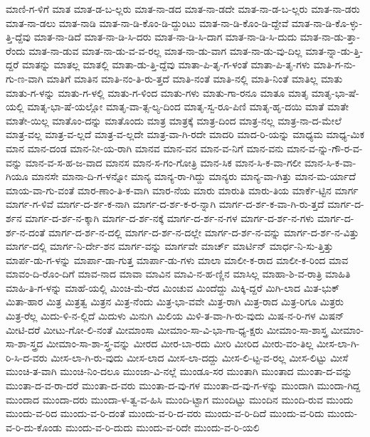 {ಮಾಣಿ-ಗ-ಳಿಗೆ
ಮಾತ
ಮಾತ-ಡ-ಬ-ಲ್ಲರು
ಮಾತ-ನಾ-ಡದ
ಮಾತ-ನಾ-ಡದೇ
ಮಾತ-ನಾ-ಡ-ಬ-ಲ್ಲರು
ಮಾತ-ನಾ-ಡರು
ಮಾತ-ನಾ-ಡಲು
ಮಾತ-ನಾಡಿ
ಮಾತ-ನಾ-ಡಿ-ಕೊಂ-ಡಿ-ದ್ದುಂಟು
ಮಾತ-ನಾ-ಡಿ-ಕೊಂ-ಡಿ-ದ್ದೇವೆ
ಮಾತ-ನಾ-ಡಿ-ಕೊ-ಳ್ಳು-ತ್ತಿ-ದ್ದೆವು
ಮಾತ-ನಾ-ಡಿದೆ
ಮಾತ-ನಾ-ಡಿ-ಸಿ-ದರು
ಮಾತ-ನಾ-ಡಿ-ಸಿ-ದಾಗ
ಮಾತ-ನಾ-ಡಿ-ಸಿ-ದುದು
ಮಾತ-ನಾ-ಡು-ತ್ತಾ-ರೆಂದು
ಮಾತ-ನಾ-ಡುವ
ಮಾತ-ನಾ-ಡು-ವ-ವ-ರಲ್ಲ
ಮಾತ-ನಾ-ಡು-ವಾಗ
ಮಾತ-ನಾ-ಡು-ವು-ದಿಲ್ಲ
ಮಾತ-ನ್ನಾ-ಡು-ತ್ತಿ-ದ್ದರೆ
ಮಾತನ್ನು
ಮಾತಲ್ಲ
ಮಾತಲ್ಲಿ
ಮಾತಾ-ಡು-ತ್ತಿ-ದ್ದೆವು
ಮಾತಾ-ಪಿ-ತೃ-ಗ-ಳಂತೆ
ಮಾತಾ-ಪಿ-ತೃ-ಗಳು
ಮಾತಿ-ಗ-ನು-ಗು-ಣ-ವಾಗಿ
ಮಾತಿಗೆ
ಮಾತಿನ
ಮಾತಿ-ನಂ-ತಿ-ರು-ತ್ತದೆ
ಮಾತಿ-ನಂತೆ
ಮಾತಿ-ನಲ್ಲಿ
ಮಾತಿ-ನಿಂತೆ
ಮಾತಿಲ್ಲ
ಮಾತು
ಮಾತು-ಗ-ಳನ್ನು
ಮಾತು-ಗ-ಳಲ್ಲಿ
ಮಾತು-ಗ-ಳಿಂದ
ಮಾತು-ಗಳು
ಮಾತು-ಗಾ-ರನೂ
ಮಾತೂ
ಮಾತೃ
ಮಾತೃ-ಭಾ-ಷೆ-ಯಲ್ಲಿ
ಮಾತೃ-ಭಾ-ಷೆ-ಯಲ್ಲೋ
ಮಾತೃ-ವಾ-ತ್ಸ-ಲ್ಯ-ದಿಂದ
ಮಾತೃ-ಸ್ವ-ರೂ-ಪಿಣಿ
ಮಾತೃ-ಹೃ-ದಯಿ
ಮಾತೆ
ಮಾತೇ
ಮಾತೇ-ಯಿಲ್ಲ
ಮಾತೊಂ-ದನ್ನು
ಮಾತೊಂದು
ಮಾತ್ರ
ಮಾತ್ರಕ್ಕೆ
ಮಾತ್ರ-ದಿಂದ
ಮಾತ್ರ-ನಲ್ಲ
ಮಾತ್ರ-ನಾ-ದ-ಮೇಲೆ
ಮಾತ್ರ-ವಲ್ಲ
ಮಾತ್ರ-ವ-ಲ್ಲದೆ
ಮಾತ್ರ-ವ-ಲ್ಲದೇ
ಮಾತ್ರ-ವಾ-ಗಿ-ರದೇ
ಮಾದರಿ
ಮಾದ-ರಿ-ಯನ್ನು
ಮಾಧ್ಯಮ
ಮಾಧ್ಯ-ಮಿಕ
ಮಾನ
ಮಾನ-ದಂಡ
ಮಾನ-ನೀ-ಯ-ರಾಗಿ
ಮಾನವ
ಮಾನ-ವನ
ಮಾನ-ವ-ನಿಗೆ
ಮಾನ-ವನು
ಮಾನ-ವ-ನ್ನು-ಗೌ-ರ-ವ-ವನ್ನು
ಮಾನ-ವ-ಸ-ಹ-ಜ-ವಾದ
ಮಾನಸ
ಮಾನ-ಸ-ಗಂ-ಗೋತ್ರಿ
ಮಾನ-ಸಿಕ
ಮಾನ-ಸಿ-ಕ-ವಾ-ಗಲೀ
ಮಾನ-ಸಿ-ಕ-ವಾ-ಗಿಯೂ
ಮಾನಸೇ
ಮಾನಾ-ದಿ-ಗ-ಳನ್ನೋ
ಮಾನ್ಯ
ಮಾನ್ಯ-ರಾ-ಗಿದ್ದು
ಮಾನ್ಯರು
ಮಾನ್ಯ-ವಾ-ಗಿತ್ತು
ಮಾನ-ಮ-ರ್ಯಾದೆ
ಮಾಯ-ವಾ-ಗು-ವಂತೆ
ಮಾರ-ಣಾಂ-ತಿ-ಕ-ವಾಗಿ
ಮಾರ-ನೆಯ
ಮಾರು
ಮಾರುತಿ
ಮಾರು-ತಿಯ
ಮಾರ್ಕೆ-ಟ್ಟಿನ
ಮಾರ್ಗ
ಮಾರ್ಗ-ಗ-ಳಿವೆ
ಮಾರ್ಗ-ದ-ರ್ಶ-ಕ-ನಾಗಿ
ಮಾರ್ಗ-ದ-ರ್ಶ-ಕ-ರ-ನ್ನಾಗಿ
ಮಾರ್ಗ-ದ-ರ್ಶ-ಕ-ವಾ-ಗಿ-ರು-ತ್ತದೆ
ಮಾರ್ಗ-ದ-ರ್ಶನ
ಮಾರ್ಗ-ದ-ರ್ಶ-ನ-ಕ್ಕಾಗಿ
ಮಾರ್ಗ-ದ-ರ್ಶ-ನಕ್ಕೆ
ಮಾರ್ಗ-ದ-ರ್ಶ-ನ-ಗಳ
ಮಾರ್ಗ-ದ-ರ್ಶ-ನ-ಗಳು
ಮಾರ್ಗ-ದ-ರ್ಶ-ನ-ದಂತೆ
ಮಾರ್ಗ-ದ-ರ್ಶ-ನ-ದಲ್ಲಿ
ಮಾರ್ಗ-ದ-ರ್ಶ-ನ-ದಲ್ಲೇ
ಮಾರ್ಗ-ದ-ರ್ಶ-ನ-ವನ್ನು
ಮಾರ್ಗ-ದ-ರ್ಶ-ನ-ವಿತ್ತು
ಮಾರ್ಗ-ದಲ್ಲಿ
ಮಾರ್ಗ-ನಿ-ರ್ದೇ-ಶನ
ಮಾರ್ಗ-ವನ್ನು
ಮಾರ್ಗವೇ
ಮಾರ್ಚ್
ಮಾರ್ಟಿನ್
ಮಾರ್ಧ-ನಿ-ಸು-ತ್ತಿತ್ತು
ಮಾರ್ಪ-ಡು-ಗ-ಳನ್ನು
ಮಾರ್ಪಾ-ಡಾ-ಗುತ್ತ
ಮಾರ್ಪಾ-ಡು-ಗಳು
ಮಾಲಾ
ಮಾಲೀ-ಕ-ರಾದ
ಮಾಲೀ-ಕ-ರಿಂದ
ಮಾವ
ಮಾವಂ-ದಿ-ರೊಂ-ದಿಗೆ
ಮಾವ-ನಾದ
ಮಾವಾ
ಮಾವಿನ
ಮಾವಿ-ನ-ಹ-ಣ್ಣಿನ
ಮಾಸಿಲ್ಲ
ಮಾಹಾ-ಶಿ-ವ-ರಾತ್ರಿ
ಮಾಹಿತಿ
ಮಾಹಿ-ತಿ-ಗ-ಳನ್ನು
ಮಾಹೆ-ಯಲ್ಲಿ
ಮಿಂಚಿ-ಮೆ-ರೆದ
ಮಿಂಚುವ
ಮಿಂದೆದ್ದು
ಮಿಕ್ಕಿ-ದ್ದರೆ
ಮಿಗಿ-ಲಾದ
ಮಿತ-ಭುಕ್
ಮಿತಾ-ಹಾರ
ಮಿತ್ರ
ಮಿತ್ರತ್ವ
ಮಿತ್ರನ
ಮಿತ್ರ-ನೆಂದು
ಮಿತ್ರ-ಭಾ-ವವೇ
ಮಿತ್ರ-ರಾಗಿ
ಮಿತ್ರ-ರಾದ
ಮಿತ್ರ-ರಿಗೂ
ಮಿತ್ರರು
ಮಿತ್ರ-ರೆಲ್ಲ
ಮಿದು-ಳಿ-ನ-ಲ್ಲಿದೆ
ಮಿದುಳು
ಮಿನುಗಿ
ಮಿಲಿಯ
ಮಿಳಿ-ತ-ವಾ-ಗಿ-ರು-ವುದು
ಮಿಷ-ನ-ರಿ-ಗಳ
ಮಿಷನ್
ಮೀಟಿ-ದರೆ
ಮೀಟು-ಗೋ-ಲಿ-ನಂತೆ
ಮೀಮಾಂಸಾ
ಮೀಮಾಂ-ಸಾ-ವಿ-ಭಾ-ಗಾ-ಧ್ಯ-ಕ್ಷರು
ಮೀಮಾಂ-ಸಾ-ಶಾಸ್ತ್ರ
ಮೀಮಾಂ-ಸಾ-ಶಾ-ಸ್ತ್ರದ
ಮೀಮಾಂ-ಸಾ-ಶಾ-ಸ್ತ್ರ-ವನ್ನು
ಮೀರದ
ಮೀರ-ಬಾ-ರದು
ಮೀರಿ
ಮೀರಿದ
ಮೀರು-ವಂ-ತಿಲ್ಲ
ಮೀಸ-ಲಾ-ಗಿ-ರಿ-ಸಿ-ದ-ವರು
ಮೀಸ-ಲಾ-ಗಿ-ರು-ವುದು
ಮೀಸ-ಲಾದ
ಮೀಸ-ಲಾ-ದದ್ದು
ಮೀಸ-ಲಿ-ಟ್ಟ-ವ-ರಲ್ಲ
ಮೀಸ-ಲಿಟ್ಟು
ಮೀಸೆ
ಮುಂಚಿ-ತ-ವಾಗಿ
ಮುಂಚಿ-ನಿಂ-ದಲೂ
ಮುಂಜಾ-ವಿ-ನಲ್ಲೆ
ಮುಂಡೂ-ಸರ
ಮುಂತಾಗಿ
ಮುಂತಾದ
ಮುಂತಾ-ದ-ವನ್ನು
ಮುಂತಾ-ದ-ವ-ರಾ-ದರೆ
ಮುಂತಾ-ದ-ವರು
ಮುಂತಾ-ದ-ವು-ಗಳ
ಮುಂತಾ-ದ-ವು-ಗ-ಳನ್ನು
ಮುಂದಾಗಿ
ಮುಂದಾ-ಗಿದ್ದ
ಮುಂದಾದ
ಮುಂದಾ-ದರು
ಮುಂದಾ-ಳ-ತ್ವ-ವ-ಹಿಸಿ
ಮುಂದಿ-ಟ್ಟಾಗ
ಮುಂದಿಟ್ಟು
ಮುಂದಿನ
ಮುಂದಿ-ರುವ
ಮುಂದು
ಮುಂದು-ವ-ರಿದ
ಮುಂದು-ವ-ರಿ-ದಂತೆ
ಮುಂದು-ವ-ರಿ-ದ-ವರು
ಮುಂದು-ವ-ರಿ-ದಿದೆ
ಮುಂದು-ವ-ರಿದು
ಮುಂದು-ವ-ರಿ-ದು-ಕೊಂಡು
ಮುಂದು-ವ-ರಿ-ದುದು
ಮುಂದು-ವ-ರಿದೇ
ಮುಂದು-ವ-ರಿ-ಯಲಿ
}
